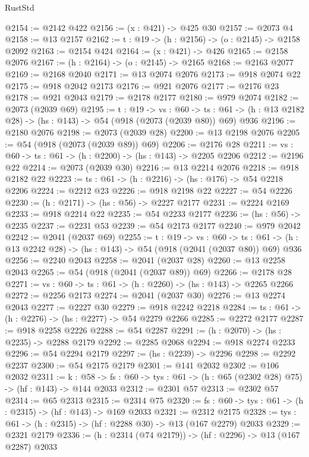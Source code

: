 \begin{lexlean}{RustStd}
\begin{coremodule}
{\begin{coremodule}
{{{{{{{{{{{{{{{{{{{{{{{{{{{@2154 := @2142 @422
@2156 := (x : @421) -> @425 @30
@2157 := @2073 @4
@2158 := @13 @2157
@2162 := {t : @19} -> (h : @2156) -> (o : @2145) -> @2158 @2092
@2163 := @2154 @424
@2164 := (x : @421) -> @426
@2165 := @2158 @2076
@2167 := (h : @2164) -> (o : @2145) -> @2165
@2168 := @2163 @2077
@2169 := @2168 @2040
@2171 := @13 @2074 @2076
@2173 := @918 @2074 @22
@2175 := @918 @2042 @2173
@2176 := @921 @2076
@2177 := @2176 @23
@2178 := @921 @2043
@2179 := @2178 @2177
@2180 := @979 @2074
@2182 := @2073 (@2039 @69)
@2195 := {t : @19} ->
  {vs : @60} ->
  {ts : @61} -> (h : @13 @2182 @28) -> (hs : @143) -> @54 (@918 (@2073 (@2039 @80)) @69) @936
@2196 := @2180 @2076
@2198 := @2073 (@2039 @28)
@2200 := @13 @2198 @2076
@2205 := @54 (@918 (@2073 (@2039 @89)) @69)
@2206 := @2176 @28
@2211 := {vs : @60} -> {ts : @61} -> (h : @2200) -> (hs : @143) -> @2205 @2206
@2212 := @2196 @22
@2214 := @2073 (@2039 @30)
@2216 := @13 @2214 @2076
@2218 := @918 @2182 @22
@2223 := {ts : @61} -> (h : @2216) -> (hs : @176) -> @54 @2218 @2206
@2224 := @2212 @23
@2226 := @918 @2198 @22
@2227 := @54 @2226
@2230 := (h : @2171) -> (hs : @56) -> @2227 @2177
@2231 := @2224 @2169
@2233 := @918 @2214 @22
@2235 := @54 @2233 @2177
@2236 := (hs : @56) -> @2235
@2237 := @2231 @53
@2239 := @54 @2173 @2177
@2240 := @979 @2042
@2242 := @2041 (@2037 @69)
@2255 := {t : @19} ->
  {vs : @60} ->
  {ts : @61} -> (h : @13 @2242 @28) -> (hs : @143) -> @54 (@918 (@2041 (@2037 @80)) @69) @936
@2256 := @2240 @2043
@2258 := @2041 (@2037 @28)
@2260 := @13 @2258 @2043
@2265 := @54 (@918 (@2041 (@2037 @89)) @69)
@2266 := @2178 @28
@2271 := {vs : @60} -> {ts : @61} -> (h : @2260) -> (hs : @143) -> @2265 @2266
@2272 := @2256 @2173
@2274 := @2041 (@2037 @30)
@2276 := @13 @2274 @2043
@2277 := @2227 @30
@2279 := @918 @2242 @2218
@2284 := {ts : @61} -> (h : @2276) -> (hs : @2277) -> @54 @2279 @2266
@2285 := @2272 @2177
@2287 := @918 @2258 @2226
@2288 := @54 @2287
@2291 := (h : @2070) -> (hs : @2235) -> @2288 @2179
@2292 := @2285 @2068
@2294 := @918 @2274 @2233
@2296 := @54 @2294 @2179
@2297 := (hs : @2239) -> @2296
@2298 := @2292 @2237
@2300 := @54 @2175 @2179
@2301 := @141 @2032
@2302 := @106 @2032
@2311 := {k : @58} ->
  {fs : @60} -> {tys : @61} -> (h : @65 (@2302 @28) @75) -> (hf : @143) -> @144 @2033
@2312 := @2301 @57
@2313 := @2302 @57
@2314 := @65 @2313
@2315 := @2314 @75
@2320 := {fs : @60} -> {tys : @61} -> (h : @2315) -> (hf : @143) -> @169 @2033
@2321 := @2312 @2175
@2328 := {tys : @61} -> (h : @2315) -> (hf : @2288 @30) -> @13 (@167 @2279) @2033
@2329 := @2321 @2179
@2336 := (h : @2314 (@74 @2179)) -> (hf : @2296) -> @13 (@167 @2287) @2033
}}}}}}}}}}}}}}}}}}}}}}}}}}}
\end{coremodule}}
\end{coremodule}
\end{lexlean}
